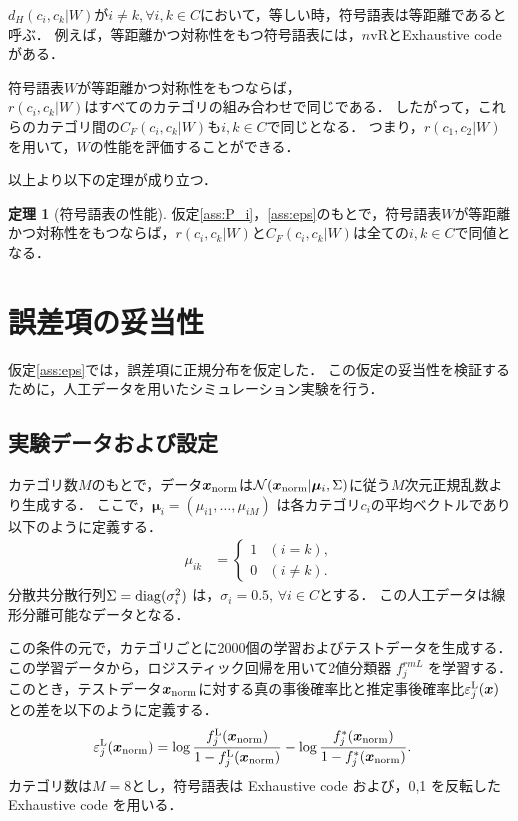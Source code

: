 \documentclass{jarticle}
\theoremstyle{definition}
\newtheorem{theorem}{定理}
\begin{document}
$d_H(c_i,c_k|W)$が$i \neq k,\forall i,k \in C$において，等しい時，符号語表は等距離であると呼ぶ．
例えば，等距離かつ対称性をもつ符号語表には，$n$vRとExhaustive codeがある．

符号語表$W$が等距離かつ対称性をもつならば，\\$r(c_i,c_k|W)$はすべてのカテゴリの組み合わせで同じである．
したがって，これらのカテゴリ間の$C_F(c_i,c_k|W)$も$i,k \in C$で同じとなる．
つまり，$r(c_1,c_2|W)$を用いて，$W$の性能を評価することができる．

以上より以下の定理が成り立つ．
\begin{theorem}[符号語表の性能]\label{th:CodeWordPerformance}
仮定\ref{ass:P_i}，\ref{ass:eps}のもとで，符号語表$W$が等距離かつ対称性をもつならば，$r(c_i,c_k|W)$と$C_F(c_i,c_k|W)$は全ての$i,k\in C$で同値となる．
\end{theorem}

\section{誤差項の妥当性}
仮定\ref{ass:eps}では，誤差項に正規分布を仮定した．
この仮定の妥当性を検証するために，人工データを用いたシミュレーション実験を行う．
\subsection{実験データおよび設定}
カテゴリ数$M$のもとで，データ$\bm{x}_{\rm norm}$は$\mathcal{N}(\bm{x}_{\rm norm}|\bm{\mu}_i, \Sigma)$に従う$M$次元正規乱数より生成する．
ここで，$\bm{\mu}_i=(\mu_{i1},\ldots,\mu_{iM})$ は各カテゴリ$c_i$の平均ベクトルであり以下のように定義する．
\begin{align}
     \mu_{ik} &= \begin{cases}
    1 & (i=k), \\
    0 & (i\neq k).
      \end{cases}
\end{align}
分散共分散行列$\Sigma={\rm diag}(\sigma_{i}^2)$ は，$\sigma_{i} = 0.5$, $\forall i\in C$とする．
この人工データは線形分離可能なデータとなる．

この条件の元で，カテゴリごとに2000個の学習およびテストデータを生成する．
この学習データから，ロジスティック回帰を用いて2値分類器 $f^{rm L}_j$ を学習する．
このとき，テストデータ$\bm{x}_{\rm norm}$に対する真の事後確率比と推定事後確率比$\varepsilon^{\rm L}_j(\bm{x})$との差を以下のように定義する．
\begin{align}\label{eq:ecoc_noise_L}
    \varepsilon^{\rm L}_j(\bm{x}_{\rm norm}) &= \log\frac{f^{\rm L}_j(\bm{x}_{\rm norm})}{1-f^{\rm L}_j(\bm{x}_{\rm norm})} - \log \frac{f^*_j(\bm{x}_{\rm norm})}{1-f^*_j(\bm{x}_{\rm norm})}.
\end{align}
カテゴリ数は$M = 8$とし，符号語表は Exhaustive code および，0,1 を反転した Exhaustive code を用いる．
\end{document}

